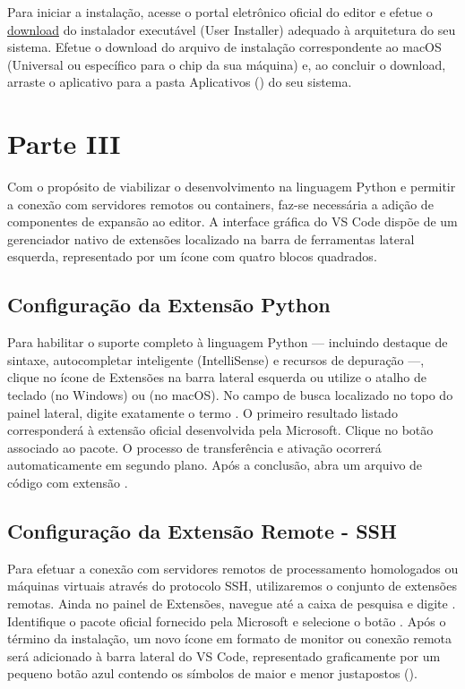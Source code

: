 Para iniciar a instalação, acesse o portal eletrônico oficial do editor e efetue o \href{https://code.visualstudio.com/download?_exp_download=fb315fc982}{download} do instalador executável (User Installer) adequado à arquitetura do seu sistema. Efetue o download do arquivo de instalação correspondente ao macOS (Universal ou específico para o chip da sua máquina) e, ao concluir o download, arraste o aplicativo  para a pasta Aplicativos () do seu sistema.


\section*{Parte III}

Com o propósito de viabilizar o desenvolvimento na linguagem Python e permitir a conexão com servidores remotos ou containers, faz-se necessária a adição de componentes de expansão ao editor. A interface gráfica do VS Code dispõe de um gerenciador nativo de extensões localizado na barra de ferramentas lateral esquerda, representado por um ícone com quatro blocos quadrados.


\subsection*{Configuração da Extensão Python}

Para habilitar o suporte completo à linguagem Python — incluindo destaque de sintaxe, autocompletar inteligente (IntelliSense) e recursos de depuração —, clique no ícone de Extensões na barra lateral esquerda ou utilize o atalho de teclado  (no Windows) ou  (no macOS).
No campo de busca localizado no topo do painel lateral, digite exatamente o termo . O primeiro resultado listado corresponderá à extensão oficial desenvolvida pela Microsoft. Clique no botão  associado ao pacote. O processo de transferência e ativação ocorrerá automaticamente em segundo plano. Após a conclusão, abra um arquivo de código com extensão .

\subsection*{Configuração da Extensão Remote - SSH}

Para efetuar a conexão com servidores remotos de processamento homologados ou máquinas virtuais através do protocolo SSH, utilizaremos o conjunto de extensões remotas.
Ainda no painel de Extensões, navegue até a caixa de pesquisa e digite . Identifique o pacote oficial fornecido pela Microsoft e selecione o botão . Após o término da instalação, um novo ícone em formato de monitor ou conexão remota será adicionado à barra lateral do VS Code, representado graficamente por um pequeno botão azul contendo os símbolos de maior e menor justapostos (\code{><}).

